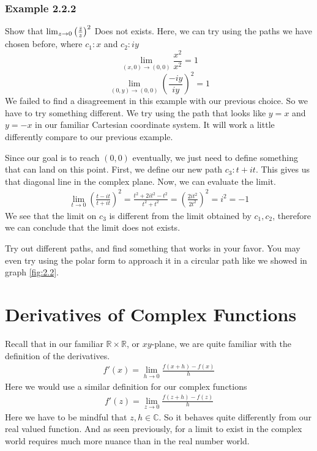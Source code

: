 \documentclass[12pt]{book}
\newcommand{\limto}[1]{\lim_{#1}}
\newcommand{\R}{\mathbb{R}}
\newcommand{\C}{\mathbb{C}}
\newcommand{\paren}[1]{\left( #1 \right)}
\begin{document}
\subsubsection{Example 2.2.2}
Show that $\limto{z \to 0} \paren{\frac{\Bar{z}}{z}}^2$ Does not exists. Here, we can try using the paths we have chosen before, where $c_1 \colon x$ and $c_2 \colon iy$
\[
\limto{(x,0)\to (0,0)}\frac{x^2}{x^2} = 1
\]
\[
\limto{(0,y)\to(0,0)} \paren{\frac{-iy}{iy}}^2 = 1
\]
We failed to find a disagreement in this example with our previous choice. So we have to try something different. We try using the path that looks like $y=x$ and $y=-x$ in our familiar Cartesian coordinate system. It will work a little differently compare to our previous example.

Since our goal is to reach $(0,0)$ eventually, we just need to define something that can land on this point. First, we define our new path $c_3 \colon t+it$. This gives us that diagonal line in the complex plane. Now, we can evaluate the limit. 
\begin{align*}
  \limto{t \to 0} \paren{\frac{t-it}{t+it}}^2 = \frac{t^2 + 2it^2-t^2}{t^2+t^2} = \paren{\frac{2it^2}{2t^2}}^2 = i^2 = -1
\end{align*}
We see that the limit on $c_3$ is different from the limit obtained by $c_1,c_2$, therefore we can conclude that the limit does not exists. 

Try out different paths, and find something that works in your favor. You may even try using the polar form to approach it in a circular path like we showed in graph  \ref{fig:2.2}. 

\section{Derivatives of Complex Functions}
Recall that in our familiar $\R \times \R$, or $xy$-plane, we are quite familiar with the definition of the derivatives.
\begin{align}
    f'(x) = \limto{h \to 0}\frac{f(x+h)-f(x)}{h}
\end{align}
Here we would use a similar definition for our complex functions
\begin{align}
    f'(z) = \limto{z \to 0}\frac{f(z+h)-f(z)}{h}
\end{align}
Here we have to be mindful that $z,h \in \C$. So it behaves quite differently from our real valued function. And as seen previously, for a limit to exist in the complex world requires much more nuance than in the real number world. 
\end{document}
